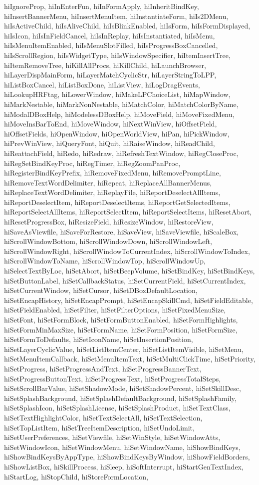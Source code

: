 {{hiIgnoreProp, hiInEnterFun, hiInFormApply, hiInheritBindKey, hiInsertBannerMenu, hiInsertMenuItem, hiInstantiateForm, hiIs2DMenu, hiIsActiveChild, hiIsAliveChild, hiIsBlinkEnabled, hiIsForm, hiIsFormDisplayed, hiIsIcon, hiIsInFieldCancel, hiIsInReplay, hiIsInstantiated, hiIsMenu, hiIsMenuItemEnabled, hiIsMenuSlotFilled, hiIsProgressBoxCancelled, hiIsScrollRegion, hiIsWidgetType, hiIsWindowSpecifier, hiItemInsertTree, hiItemRemoveTree, hiKillAllProcs, hiKillChild, hiLaunchBrowser, hiLayerDispMainForm, hiLayerMatchCyclicStr, hiLayerStringToLPP, hiListBoxCancel, hiListBoxDone, hiListView, hiLogDragEvents, hiLookupHRFtag, hiLowerWindow, hiMakeLPChoiceList, hiMapWindow, hiMarkNestable, hiMarkNonNestable, hiMatchColor, hiMatchColorByName, hiModalDBoxHelp, hiModelessDBoxHelp, hiMoveField, hiMoveFixedMenu, hiMoveInsBarToEnd, hiMoveWindow, hiNextWinView, hiOffsetField, hiOffsetFields, hiOpenWindow, hiOpenWorldView, hiPan, hiPickWindow, hiPrevWinView, hiQueryFont, hiQuit, hiRaiseWindow, hiReadChild, hiReattachField, hiRedo, hiRedraw, hiRefreshTextWindow, hiRegCloseProc, hiRegSetBindKeyProc, hiRegTimer, hiRegZoomPanProc, hiRegisterBindKeyPrefix, hiRemoveFixedMenu, hiRemovePromptLine, hiRemoveTextWordDelimiter, hiRepeat, hiReplaceAllBannerMenus, hiReplaceTextWordDelimiter, hiReplayFile, hiReportDeselectAllItems, hiReportDeselectItem, hiReportDeselectItems, hiReportGetSelectedItems, hiReportSelectAllItems, hiReportSelectItem, hiReportSelectItems, hiResetAbort, hiResetProgressBox, hiResizeField, hiResizeWindow, hiRestoreView, hiSaveAsViewfile, hiSaveForRestore, hiSaveView, hiSaveViewfile, hiScaleBox, hiScrollWindowBottom, hiScrollWindowDown, hiScrollWindowLeft, hiScrollWindowRight, hiScrollWindowToCurrentIndex, hiScrollWindowToIndex, hiScrollWindowToName, hiScrollWindowTop, hiScrollWindowUp, hiSelectTextByLoc, hiSetAbort, hiSetBeepVolume, hiSetBindKey, hiSetBindKeys, hiSetButtonLabel, hiSetCallbackStatus, hiSetCurrentField, hiSetCurrentIndex, hiSetCurrentWindow, hiSetCursor, hiSetDBoxDefaultLocation, hiSetEncapHistory, hiSetEncapPrompt, hiSetEncapSkillCmd, hiSetFieldEditable, hiSetFieldEnabled, hiSetFilter, hiSetFilterOptions, hiSetFixedMenuSize, hiSetFont, hiSetFormBlock, hiSetFormButtonEnabled, hiSetFormHighlights, hiSetFormMinMaxSize, hiSetFormName, hiSetFormPosition, hiSetFormSize, hiSetFormToDefaults, hiSetIconName, hiSetInsertionPosition, hiSetLayerCyclicValue, hiSetListItemCenter, hiSetListItemVisible, hiSetMenu, hiSetMenuItemCallback, hiSetMenuItemText, hiSetMultiClickTime, hiSetPriority, hiSetProgress, hiSetProgressAndText, hiSetProgressBannerText, hiSetProgressButtonText, hiSetProgressText, hiSetProgressTotalSteps, hiSetScrollBarValue, hiSetShadowMode, hiSetShadowPercent, hiSetSkillDesc, hiSetSplashBackground, hiSetSplashDefaultBackground, hiSetSplashFamily, hiSetSplashIcon, hiSetSplashLicense, hiSetSplashProduct, hiSetTextClass, hiSetTextHighlightColor, hiSetTextSelectAll, hiSetTextSelection, hiSetTopListItem, hiSetTreeItemDescription, hiSetUndoLimit, hiSetUserPreferences, hiSetViewfile, hiSetWinStyle, hiSetWindowAtts, hiSetWindowIcon, hiSetWindowMenu, hiSetWindowName, hiShowBindKeys, hiShowBindKeysByAppType, hiShowBindKeysByWindow, hiShowFieldBorders, hiShowListBox, hiSkillProcess, hiSleep, hiSoftInterrupt, hiStartGenTextIndex, hiStartLog, hiStopChild, hiStoreFormLocation, }}
